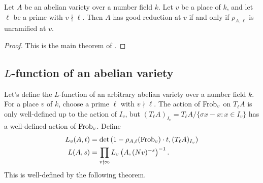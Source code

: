 \begin{theorem}
Let $A$ be an abelian variety over a number field $k$. Let $v$ be a place of 
$k$, and let $\ell$ be a prime with $v\nmid \ell$. Then $A$ has good reduction 
at $v$ if and only if $\rho_{A,\ell}$ is unramified at $v$. 
\end{theorem}
\begin{proof}
This is the main theorem of \cite{st68}. 
\end{proof}





\subsection{\texorpdfstring{$L$}{L}-function of an abelian variety}

Let's define the $L$-function of an arbitrary abelian variety over a number 
field $k$. For a place $v$ of $k$, choose a prime $\ell$ with $v\nmid \ell$. 
The action of $\mathrm{Frob}_v$ on $T_\ell A$ is only well-defined up to the action of 
$I_v$, but $(T_\ell A)_{I_v} = T_\ell A / \{\sigma x-x:x\in I_v\}$ has a 
well-defined action of $\mathrm{Frob}_v$. Define
\begin{align*}
  L_v(A,t) &= \det\left(1-\rho_{A,\ell}(\mathrm{Frob}_v)\cdot t,(T_\ell A)_{I_v}\right) \\
  L(A,s) &= \prod_{v\nmid \infty} L_v\left(A,(N v)^{-s}\right)^{-1} \text{.}
\end{align*}
This is well-defined by the following theorem. 

